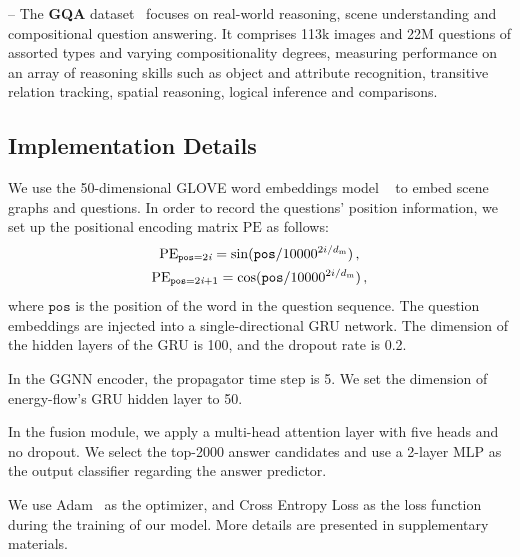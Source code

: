 \documentclass[letterpaper]{article} %
\begin{document}
\noindent --  The \textbf{GQA} dataset~\cite{DBLP:conf/cvpr/HudsonM19} focuses on real-world reasoning, scene understanding and compositional question answering. 
It comprises 113k images and 22M questions of assorted types and varying compositionality degrees, measuring performance on an array of reasoning skills such as object and attribute recognition, transitive relation tracking, spatial reasoning, logical inference and comparisons.



\subsection{Implementation Details}
We use the 50-dimensional GLOVE word embeddings model ~\cite{pennington-etal-2014-glove} to 
embed scene graphs and questions.
In order to record the questions' position information, we set up the positional encoding matrix $\textrm{PE}$ as follows:
\begin{gather}
    \textrm{PE}_{\texttt{pos}=2\emph{i}} = \sin(\texttt{pos}/10000^{2i/d_{\textrm{m}}}) \, ,\\
    \textrm{PE}_{\texttt{pos}=2\emph{i}+1} = \cos(\texttt{pos}/10000^{2i/d_{\textrm{m}}}) \, , 
\end{gather}
where $\texttt{pos}$ is the position of the word in the question sequence.
The question embeddings are injected into a single-directional GRU network. The dimension of the hidden layers of the GRU is 100, and the dropout rate is 0.2.

In the GGNN encoder, the propagator time step is 5. 
We set the dimension of energy-flow's GRU hidden layer to 50. 

In the fusion module, we apply a multi-head attention layer with five heads and no dropout. We select the top-2000 answer candidates and use a 2-layer MLP as the output classifier regarding the answer predictor.

We use Adam~\cite{DBLP:journals/corr/KingmaB14} as the optimizer, and Cross Entropy Loss as the loss function during the training of our model. 
More details are presented in supplementary materials.
\end{document}
